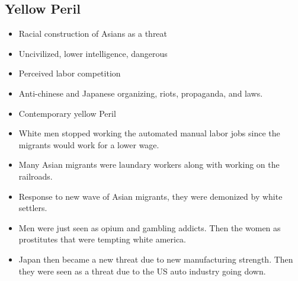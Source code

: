 \documentclass{article}
\begin{document}
\subsection{Yellow Peril}
\begin{itemize}
  \item Racial construction of Asians as a threat
  \item Uncivilized, lower intelligence, dangerous
  \item Perceived labor competition
  \item Anti-chinese and Japanese organizing, riots, propaganda, and laws.
  \item Contemporary yellow Peril
  \item White men stopped working the automated manual labor jobs since
    the migrants would work for a lower wage.
  \item Many Asian migrants were laundary workers along
    with working on the railroads.
  \item Response to new wave of Asian migrants,
    they were demonized by white settlers.
  \item Men were just seen as opium and gambling addicts. Then
    the women as prostitutes that were tempting white america.
  \item Japan then became a new threat due to new manufacturing strength.
    Then they were seen as a threat due to the US auto industry going down.
\end{itemize}
\end{document}
